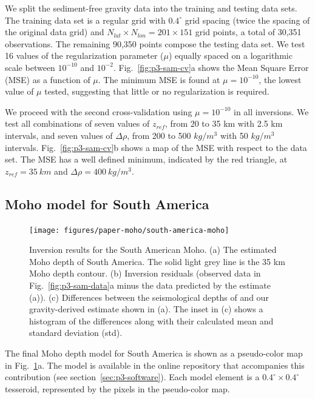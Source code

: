 We split the sediment-free gravity data into the training and testing data
sets.
The training data set is a regular grid with $0.4^\circ$ grid spacing
(twice the spacing of the original data grid)
and $N_{lat} \times N_{lon} = 201 \times 151$ grid points,
a total of 30,351 observations.
The remaining 90,350 points compose the testing data set.
We test 16 values of the regularization parameter ($\mu$)
equally spaced on a logarithmic scale between $10^{-10}$ and $10^{-2}$.
Fig.~\ref{fig:p3-sam-cv}a shows the Mean Square Error (MSE)
as a function of $\mu$.
The minimum MSE is found at $\mu = 10^{-10}$, the lowest value of $\mu$ tested,
suggesting that little or no regularization is required.

We proceed with the second cross-validation using $\mu = 10^{-10}$ in all
inversions.
We test all combinations of
seven values of $z_{ref}$, from 20 to 35 km with 2.5 km intervals,
and seven values of $\Delta\rho$, from 200 to 500 $kg/m^3$
with 50 $kg/m^3$ intervals.
Fig.~\ref{fig:p3-sam-cv}b shows a map of the MSE
with respect to the \citet{assumpcao2013a} data set.
The MSE has a well defined minimum, indicated by the red triangle,
at $z_{ref} = 35\ km$ and $\Delta\rho = 400\ kg/m^3$.


\subsection{Moho model for South America}

\begin{figure}
    \centering
    \texttt{[image: figures/paper-moho/south-america-moho]}
    \caption{
        Inversion results for the South American Moho.
        (a) The estimated Moho depth of South America.
        The solid light grey line is the 35 km Moho depth contour.
        (b) Inversion residuals (observed data in Fig.~\ref{fig:p3-sam-data}a
        minus the data predicted by the estimate (a)).
        (c) Differences between the seismological depths of
        \citet{assumpcao2013a} and our gravity-derived estimate shown in (a).
        The inset in (c) shows a histogram of the differences along with their
        calculated mean and standard deviation (std).
    }
    \label{fig:p3-sam-moho}
\end{figure}


The final Moho depth model for South America is shown
as a pseudo-color map in Fig.~\ref{fig:p3-sam-moho}a.
The model is available in the online repository that accompanies
this contribution (see section~\ref{sec:p3-software}).
Each model element is a $0.4^\circ \times 0.4^\circ$ tesseroid,
represented by the pixels in the pseudo-color map.

